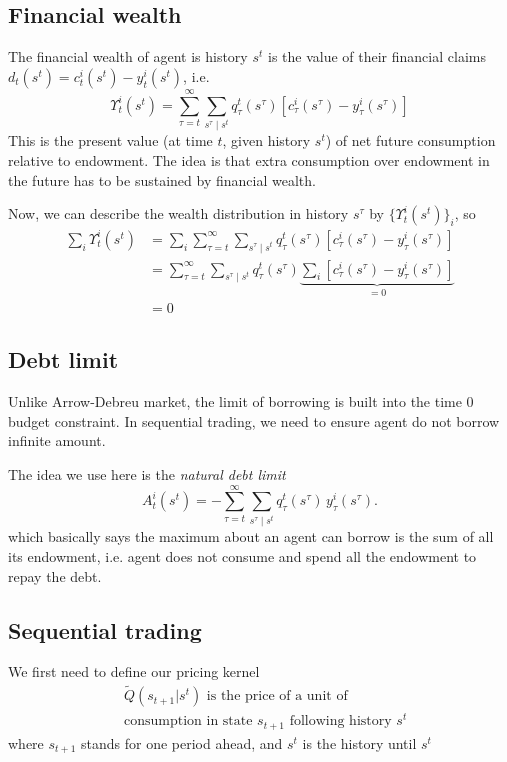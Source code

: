 \documentclass[twocolumn, fleqn]{article}
\numberwithin{equation}{section}
\begin{document}
	\subsection{Financial wealth}
	The financial wealth of agent is history $s^t$ is the value of their financial claims $d_t(s^t) = c_t^i(s^t) - y_t^i(s^t)$, i.e. 
	\begin{equation}
		\Upsilon_t^i(s^t) = \sum_{\tau = t}^{\infty} \sum_{s^\tau \mid s^t} q_\tau^t(s^\tau) \left[ c_\tau^i(s^\tau) - y_\tau^i(s^\tau) \right]
	\end{equation}
	This is the present value (at time $t$, given history $s^t$) of net future consumption relative to endowment. The idea is that extra consumption over endowment in the future has to be sustained by financial wealth.
	
	Now, we can describe the wealth distribution in history $s^\tau$ by $\{\Upsilon_t^i(s^t)\}_i$, so 
	\begin{align*}
		\sum_i \Upsilon_t^i(s^t) &= \sum_i \sum_{\tau = t}^{\infty} \sum_{s^\tau \mid s^t} q_\tau^t(s^\tau) \left[ c_\tau^i(s^\tau) - y_\tau^i(s^\tau) \right]\\
		&= \sum_{\tau = t}^{\infty} \sum_{s^\tau \mid s^t} q_\tau^t(s^\tau) \underbrace{\sum_i\left[ c_\tau^i(s^\tau) - y_\tau^i(s^\tau) \right]}_{=0}\\
		&= 0
	\end{align*}
	
	\subsection{Debt limit}
	Unlike Arrow-Debreu market, the limit of borrowing is built into the time 0 budget constraint. In sequential trading, we need to ensure agent do not borrow infinite amount. 
	
	The idea we use here is the \textit{natural debt limit}
	\begin{equation}
		A_t^i(s^t) = -                                                                                                                                        \sum_{\tau = t}^{\infty} \sum_{s^\tau \mid s^t} q_\tau^t(s^\tau) \, y_\tau^i(s^\tau).
	\end{equation}	
	which basically says the maximum about an agent can borrow is the sum of all its endowment, i.e. agent does not consume and spend all the endowment to repay the debt.
	
	\subsection{Sequential trading}
	We first need to define our pricing kernel
	\begin{align*}
		&\tilde{Q}(s_{t+1} | s^t) \text{ is the price of a unit of}\\
		&\text{consumption in state } s_{t+1} \text{ following history } s^t
	\end{align*}
	where $s_{t+1}$ stands for one period ahead, and $s^t$ is the history until $s^t$
	
\end{document}

